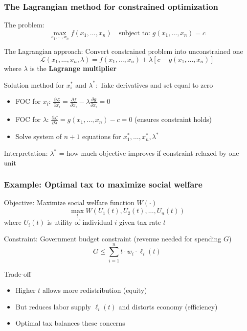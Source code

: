 \documentclass[aspectratio=169]{beamer}
\begin{document}
\begin{frame}
\frametitle{The Lagrangian method for constrained optimization}
The problem:
\begin{equation*}
\max_{x_1, \ldots, x_n} f(x_1, \ldots, x_n) \quad \text{subject to: } g(x_1, \ldots, x_n) = c
\end{equation*}

The Lagrangian approach: Convert constrained problem into unconstrained one
\begin{equation*}
\mathcal{L}(x_1, \ldots, x_n, \lambda) = f(x_1, \ldots, x_n) + \lambda \left[c-g(x_1, \ldots, x_n)\right]
\end{equation*}
where $\lambda$ is the \textbf{Lagrange multiplier}  \medskip

Solution method for $x_i^*$ and $\lambda^*$: Take derivatives and set equal to zero
\begin{itemize}\setlength\itemsep{3pt}
\item FOC for $x_i$: $\frac{\partial \mathcal{L}}{\partial x_i} = \frac{\partial f}{\partial x_i} - \lambda \frac{\partial g}{\partial x_i} = 0$
\item FOC for $\lambda$: $\frac{\partial \mathcal{L}}{\partial \lambda} = g(x_1, \ldots, x_n) - c = 0$ (ensures constraint holds)
\item Solve system of $n+1$ equations for $x_1^*, \ldots, x_n^*, \lambda^*$
\end{itemize} \medskip

Interpretation: $\lambda^*$ = how much objective improves if constraint relaxed by one unit
\end{frame}

\begin{frame}
\frametitle{Example: Optimal tax to maximize social welfare}

Objective: Maximize social welfare function $W(\cdot)$
\begin{equation*}
\max_{t} W(U_1(t), U_2(t), \ldots, U_n(t))
\end{equation*}
where $U_i(t)$ is utility of individual $i$ given tax rate $t$ \medskip

Constraint: Government budget constraint (revenue needed for spending $G$)
\begin{equation*}
G \leq  \sum_{i=1}^n t \cdot w_i \cdot \ell_i(t) 
\end{equation*}

Trade-off
\begin{itemize}\setlength\itemsep{3pt}
\item Higher $t$ allows more redistribution (equity)
\item But reduces labor supply $\ell_i(t)$ and distorts economy (efficiency)
\item Optimal tax balances these concerns
\end{itemize}
\end{frame}
\end{document}
